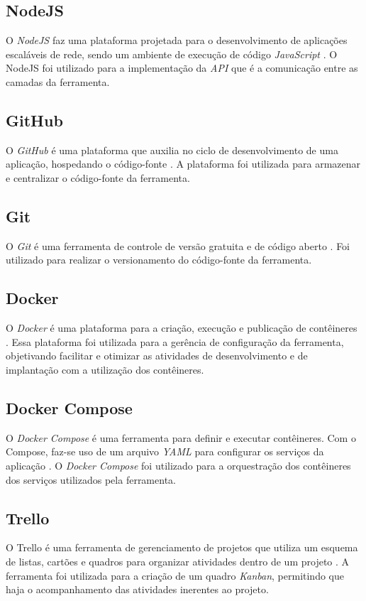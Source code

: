 \subsection{NodeJS}
O \textit{NodeJS} faz uma plataforma projetada para o desenvolvimento de aplicações escaláveis de rede, sendo um ambiente de execução de código \textit{JavaScript} \cite{nodejs}. O NodeJS foi utilizado para a implementação da \textit{API} que é a comunicação entre as camadas da ferramenta.

\subsection{GitHub}
O \textit{GitHub} é uma plataforma que auxilia no ciclo de desenvolvimento de uma aplicação, hospedando o código-fonte \cite{github}. A plataforma foi utilizada para armazenar e centralizar o código-fonte da ferramenta.

\subsection{Git}
O \textit{Git} é uma ferramenta de controle de versão gratuita e de código aberto \cite{git}. Foi utilizado para realizar o versionamento do código-fonte da ferramenta.

\subsection{Docker}
O \textit{Docker} é uma plataforma para a criação, execução e publicação de contêineres \cite{docker}. Essa plataforma foi utilizada para a gerência de configuração da ferramenta, objetivando facilitar e otimizar as atividades de desenvolvimento e de implantação com a utilização dos contêineres.

\subsection{Docker Compose}
O \textit{Docker Compose} é uma ferramenta para definir e executar contêineres. Com o Compose, faz-se uso de um arquivo \textit{YAML} para configurar os serviços da aplicação \cite{docker-compose}. O \textit{Docker Compose} foi utilizado para a orquestração dos contêineres dos serviços utilizados pela ferramenta.

\subsection{Trello}
O Trello é uma ferramenta de gerenciamento de projetos que utiliza um esquema de listas, cartões e quadros para organizar atividades dentro de um projeto \cite{trello}. A ferramenta foi utilizada para a criação de um quadro \textit{Kanban}, permitindo que haja o acompanhamento das atividades inerentes ao projeto.

